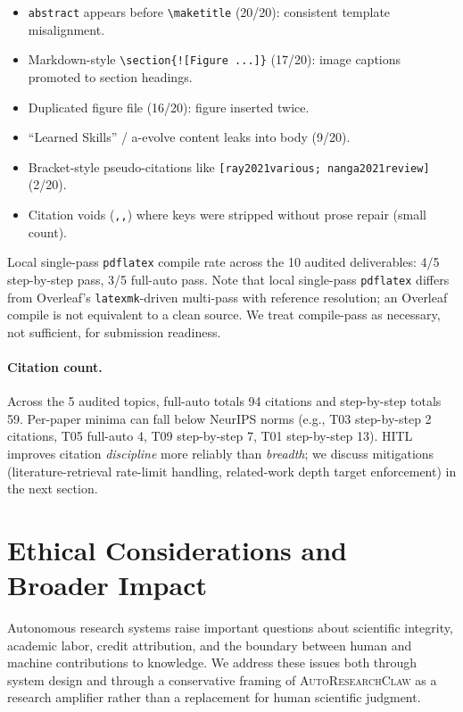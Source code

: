 \documentclass{llmxive}
\providecommand{\eg}{e.g.,\xspace}
\providecommand{\system}{\textsc{AutoResearchClaw}}
\begin{document}
\begin{itemize}[nosep,leftmargin=*]
\item \texttt{abstract} appears before \texttt{\textbackslash maketitle} (20/20):
  consistent template misalignment.
\item Markdown-style \texttt{\textbackslash section\{![Figure ...]\}} (17/20):
  image captions promoted to section headings.
\item Duplicated figure file (16/20): figure inserted twice.
\item ``Learned Skills'' / a-evolve content leaks into body (9/20).
\item Bracket-style pseudo-citations like \texttt{[ray2021various; nanga2021review]}
  (2/20).
\item Citation voids (\texttt{,,}) where keys were stripped without prose repair
  (small count).
\end{itemize}

Local single-pass \texttt{pdflatex} compile rate across the 10 audited
deliverables: 4/5 step-by-step pass, 3/5 full-auto pass. Note that local
single-pass \texttt{pdflatex} differs from Overleaf's \texttt{latexmk}-driven
multi-pass with reference resolution; an Overleaf compile is not equivalent to a
clean source. We treat compile-pass as necessary, not sufficient, for submission
readiness.

\paragraph{Citation count.}
Across the 5 audited topics, full-auto totals 94 citations and step-by-step totals
59. Per-paper minima can fall below NeurIPS norms (\eg{} T03 step-by-step 2
citations, T05 full-auto 4, T09 step-by-step 7, T01 step-by-step 13). HITL
improves citation \emph{discipline} more reliably than \emph{breadth}; we discuss
mitigations (literature-retrieval rate-limit handling, related-work depth target
enforcement) in the next section.

\section{Ethical Considerations and Broader Impact}
\label{sec:ethics}

Autonomous research systems raise important questions about scientific integrity, academic labor, credit attribution, and the boundary between human and machine contributions to knowledge. We address these issues both through system design and through a conservative framing of \system{} as a research amplifier rather than a replacement for human scientific judgment.
\end{document}
